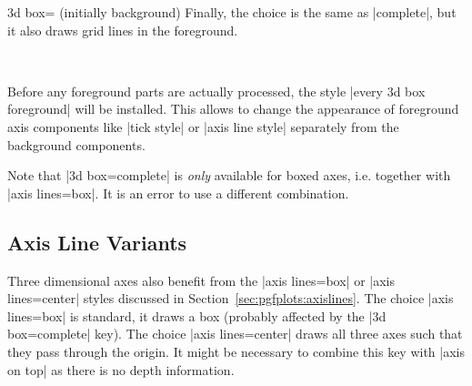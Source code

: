 {\begin{pgfplotskey}{3d box= (initially background)}
    Finally, the choice  is the same as |complete|, but
    it also draws grid lines in the foreground.
\begin{codeexample}[]
%
~
\end{codeexample}

    Before any foreground parts are actually processed, the style
    |every 3d box foreground| will be installed. This allows to change the
    appearance of foreground axis components like |tick style| or
    |axis line style| separately from the background components.

    Note that |3d box=complete| is \emph{only} available for boxed axes, i.e.\@
    together with |axis lines=box|. It is an error to use a different
    combination.
\end{pgfplotskey}


\subsection{Axis Line Variants}
\label{sec:pgfplots:axislines:3d}

Three dimensional axes also benefit from the |axis lines=box| or
|axis lines=center| styles discussed in Section~\ref{sec:pgfplots:axislines}.
The choice |axis lines=box| is standard, it draws a box (probably affected by
the |3d box=complete| key). The choice |axis lines=center| draws all three axes
such that they pass through the origin. It might be necessary to combine this
key with |axis on top| as there is no depth information.

\begin{codeexample}[]
\end{codeexample}

}
